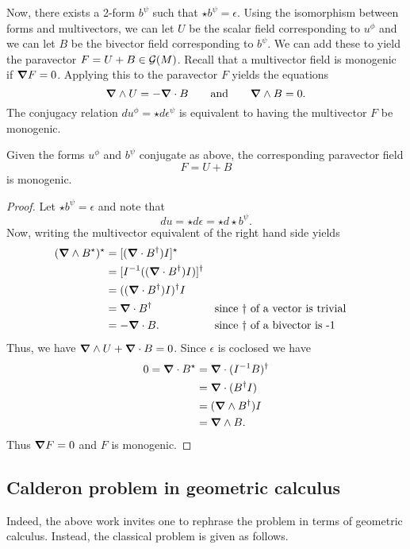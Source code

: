 Now, there exists a 2-form $b^\psi$ such that $\star b^\psi = \epsilon$.  Using the isomorphism between forms and multivectors, we can let $U$ be the scalar field corresponding to $u^\phi$ and we can let $B$ be the bivector field corresponding to $b^\psi$.  We can add these to yield the paravector $F=U+B \in \mathcal{G}(M)$.   Recall that a multivector field is monogenic if $\boldsymbol{\nabla} F=0$.  Applying this to the paravector $F$ yields the equations
\[
\boldsymbol{\nabla} \wedge U = -\boldsymbol{\nabla} \cdot B \qquad \textrm{and} \qquad \boldsymbol{\nabla} \wedge B = 0.
\]
The conjugacy relation $du^\phi = \star d \epsilon^\psi$ is equivalent to having the multivector $F$ be monogenic.

\begin{lemma}
Given the forms $u^\phi$ and $b^\psi$ conjugate as above, the corresponding paravector field
\[
F = U + B
\]
is monogenic.
\end{lemma}
\begin{proof}
Let $\star b^\psi = \epsilon$ and note that 
\[
d u = \star d \epsilon = \star d \star b^\psi.  
\]
Now, writing the multivector equivalent of the right hand side yields
\begin{align*}
(\boldsymbol{\nabla} \wedge B^\star )^\star &= [(\boldsymbol{\nabla} \cdot B^\dagger) I]^\star\\
    &= [I^{-1} ((\boldsymbol{\nabla} \cdot B^\dagger) I)]^\dagger\\
    &= ((\boldsymbol{\nabla} \cdot B^\dagger)I)^\dagger I\\
    &= \boldsymbol{\nabla} \cdot B^\dagger && \textrm{since $\dagger$ of a vector is trivial}\\
    &= -\boldsymbol{\nabla} \cdot B. && \textrm{since $\dagger$ of a bivector is -1}
\end{align*}
Thus, we have $\boldsymbol{\nabla} \wedge U + \boldsymbol{\nabla} \cdot B = 0$. Since $\epsilon$ is coclosed we have
\begin{align*}
0=\boldsymbol{\nabla} \cdot B^\star &= \boldsymbol{\nabla} \cdot (I^{-1} B)^\dagger \\
    &= \boldsymbol{\nabla} \cdot (B^\dagger I)\\
    &= (\boldsymbol{\nabla} \wedge B^\dagger) I\\
    &= \boldsymbol{\nabla} \wedge B.
\end{align*}
Thus $\boldsymbol{\nabla} F =0$ and $F$ is monogenic.
\end{proof}

\subsection{Calderon problem in geometric calculus}

Indeed, the above work invites one to rephrase the problem in terms of geometric calculus.  Instead, the classical problem is given as follows.

